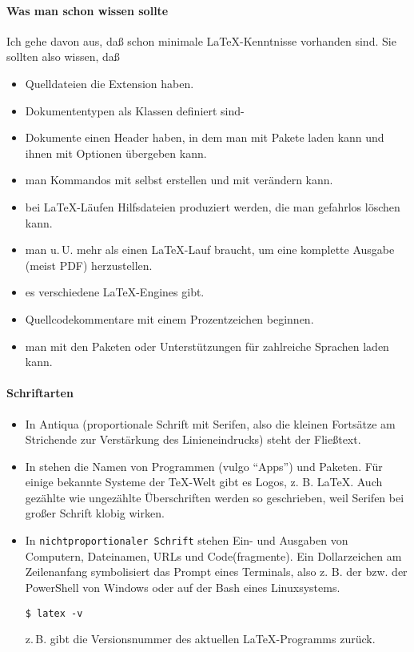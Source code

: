 \documentclass[11pt,table]{scrreprt}
\begin{document}
\paragraph{Was man schon wissen sollte}
Ich gehe davon aus, daß schon minimale \LaTeX-Kenntnisse vorhanden sind. Sie sollten also wissen, daß \textellipsis
\begin{itemize}
\item \textellipsis Quelldateien die Extension  haben.
\item \textellipsis Dokumententypen als Klassen definiert sind-
\item \textellipsis Dokumente einen Header haben, in dem man mit  Pakete laden kann und ihnen mit \Kbd{[key=value]} Optionen übergeben kann.
\item \textellipsis man Kommandos mit  selbst erstellen und mit  verändern kann.
\item \textellipsis bei \LaTeX-Läufen Hilfsdateien produziert werden, die man gefahrlos löschen kann.
\item \textellipsis man u.\,U. mehr als einen \LaTeX-Lauf braucht, um eine komplette Ausgabe (meist PDF) herzustellen.
\item \textellipsis es verschiedene \LaTeX-Engines gibt.
\item \textellipsis Quellcodekommentare mit einem Prozentzeichen beginnen.
\item \textellipsis man mit den Paketen  oder  Unterstützungen für zahlreiche Sprachen laden kann.
\end{itemize}

\paragraph{Schriftarten}
\begin{itemize}
\item In Antiqua (proportionale Schrift mit Serifen, also die kleinen Fortsätze am Strichende zur Verstärkung des Linieneindrucks) steht der Fließtext.
\item In  stehen die Namen von Programmen (vulgo \enquote{Apps}) und Paketen. Für einige bekannte Systeme der \TeX-Welt gibt es Logos, z. B. \LaTeX. Auch gezählte wie ungezählte Überschriften werden so geschrieben, weil Serifen bei großer Schrift klobig wirken.
\item In \texttt{nichtproportionaler Schrift} stehen Ein- und Ausgaben von Computern, Dateinamen, URLs und Code(fragmente). Ein Dollarzeichen am Zeilenanfang symbolisiert das Prompt eines Terminals, also z. B.  der  bzw.  der PowerShell von Windows oder  auf der Bash eines Linuxsystems.
\begin{lstlisting}
$ latex -v
\end{lstlisting}
z.\,B. gibt die Versionsnummer des aktuellen \LaTeX-Programms zurück.
\end{itemize}
\end{document}
